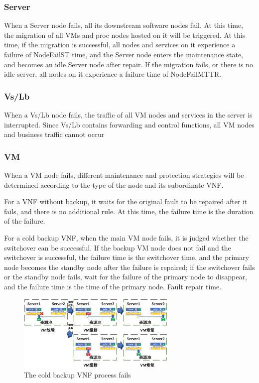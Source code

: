 \documentclass[journal]{IEEEtran}
\begin{document}
    \subsubsection{Server}
    When a Server node fails, all its downstream software nodes fail. At this time, the migration of all VMs and proc nodes hosted on it will be triggered. At this time, if the migration is successful, all nodes and services on it experience a failure of NodeFailST time, and the Server node enters the maintenance state, and becomes an idle Server node after repair. If the migration fails, or there is no idle server, all nodes on it experience a failure time of NodeFailMTTR.

    \subsubsection{Vs/Lb}
    When a Vs/Lb node fails, the traffic of all VM nodes and services in the server is interrupted. Since Vs/Lb contains forwarding and control functions, all VM nodes and business traffic cannot occur

    \subsubsection{VM}
    When a VM node fails, different maintenance and protection strategies will be determined according to the type of the node and its subordinate VNF.

    For a VNF without backup, it waits for the original fault to be repaired after it fails, and there is no additional rule. At this time, the failure time is the duration of the failure.

    For a cold backup VNF, when the main VM node fails, it is judged whether the switchover can be successful. If the backup VM node does not fail and the switchover is successful, the failure time is the switchover time, and the primary node becomes the standby node after the failure is repaired; if the switchover fails or the standby node fails, wait for the failure of the primary node to disappear, and the failure time is the time of the primary node. Fault repair time.

    \begin{figure}[!t]
        \begin{center}
            \includegraphics[width = 3in]{img/7.eps}
            \caption{The cold backup VNF process fails}
            \label{fig4}
        \end{center}
    \end{figure}
\end{document}
